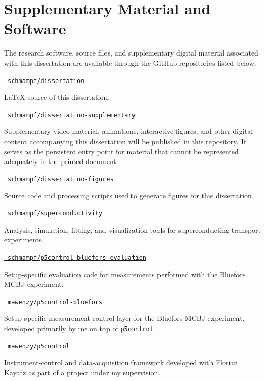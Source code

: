 
\chapter{Supplementary Material and Software}
\label{appendix:software-supplementary}

The research software, source files, and supplementary digital material associated with this dissertation are available through the GitHub repositories listed below.

\medskip
\noindent\href{https://github.com/schmampf/dissertation}{\githubicon\ \texttt{schmampf/dissertation}}\par
\noindent LaTeX source of this dissertation.

\medskip
\noindent\href{https://github.com/schmampf/dissertation-supplementary}{\githubicon\ \texttt{schmampf/dissertation-supplementary}}\par
\noindent Supplementary video material, animations, interactive figures, and other digital content accompanying this dissertation will be published in this repository. It serves as the persistent entry point for material that cannot be represented adequately in the printed document.

\medskip
\noindent\href{https://github.com/schmampf/dissertation-figures}{\githubicon\ \texttt{schmampf/dissertation-figures}}\par
\noindent Source code and processing scripts used to generate figures for this dissertation.

\medskip
\noindent\href{https://github.com/schmampf/superconductivity}{\githubicon\ \texttt{schmampf/superconductivity}}\par
\noindent Analysis, simulation, fitting, and visualization tools for superconducting transport experiments.

\medskip
\noindent\href{https://github.com/schmampf/p5control-bluefors-evaluation}{\githubicon\ \texttt{schmampf/p5control-bluefors-evaluation}}\par
\noindent Setup-specific evaluation code for measurements performed with the Bluefors MCBJ experiment.

\medskip
\noindent\href{https://github.com/mawenzy/p5control-bluefors}{\githubicon\ \texttt{mawenzy/p5control-bluefors}}\par
\noindent Setup-specific measurement-control layer for the Bluefors MCBJ experiment, developed primarily by me on top of \texttt{p5control}.

\medskip
\noindent\href{https://github.com/mawenzy/p5control}{\githubicon\ \texttt{mawenzy/p5control}}\par
\noindent Instrument-control and data-acquisition framework developed with Florian Kayatz as part of a project under my supervision.
